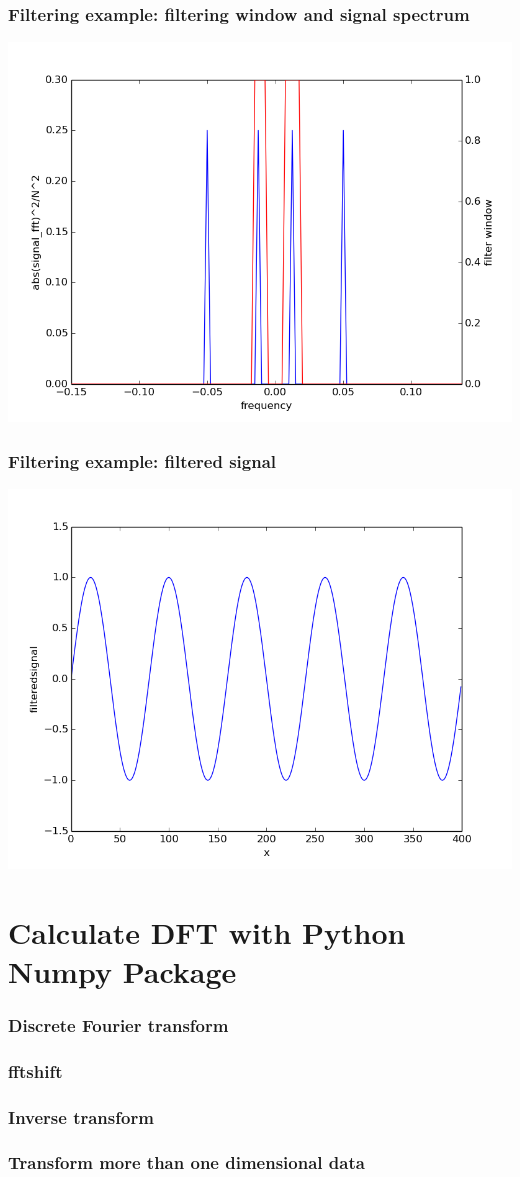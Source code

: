 \documentclass{beamer}
\begin{document}
\begin{frame}
\frametitle{Filtering example: filtering window and signal spectrum}
\includegraphics[scale=0.5]{dft_and_filterwindow.png}
\end{frame}
\begin{frame}
\frametitle{Filtering example: filtered signal}
\includegraphics[scale=0.5]{filtered_signal.png}
\end{frame}
\section{Calculate DFT with Python Numpy Package}
\begin{frame}
\frametitle{Discrete Fourier transform}
\end{frame}
\begin{frame}
\frametitle{fftshift}

\end{frame}
\begin{frame}
\frametitle{Inverse transform}

\end{frame}
\begin{frame}
\frametitle{Transform more than one dimensional data}

\end{frame}
\end{document}
